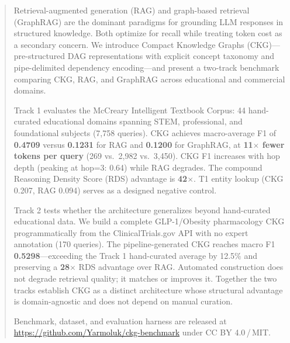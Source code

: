 \begin{abstract}
Retrieval-augmented generation (RAG) and graph-based retrieval (GraphRAG)
are the dominant paradigms for grounding LLM responses in structured
knowledge. Both optimize for recall while treating token cost as a
secondary concern. We introduce Compact Knowledge Graphs (CKG)---pre-structured
DAG representations with explicit concept taxonomy and pipe-delimited
dependency encoding---and present a two-track benchmark comparing CKG,
RAG, and GraphRAG across educational and commercial domains.

Track 1 evaluates the McCreary Intelligent Textbook Corpus: 44
hand-curated educational domains spanning STEM, professional, and
foundational subjects (7,758 queries). CKG achieves macro-average
F1 of \textbf{0.4709} versus \textbf{0.1231} for RAG and \textbf{0.1200}
for GraphRAG, at \textbf{11$\times$ fewer tokens per query} (269 vs.\
2,982 vs.\ 3,450). CKG F1 increases with hop depth (peaking at hop=3:
0.64) while RAG degrades. The compound Reasoning Density Score (RDS)
advantage is \textbf{42$\times$}. T1 entity lookup (CKG 0.207, RAG 0.094)
serves as a designed negative control.

Track 2 tests whether the architecture generalizes beyond hand-curated
educational data. We build a complete GLP-1/Obesity pharmacology CKG
programmatically from the ClinicalTrials.gov API with no expert
annotation (170 queries). The pipeline-generated CKG reaches macro F1
\textbf{0.5298}---exceeding the Track 1 hand-curated average by 12.5\%
and preserving a \textbf{28$\times$} RDS advantage over RAG. Automated
construction does not degrade retrieval quality; it matches or improves
it. Together the two tracks establish CKG as a distinct architecture
whose structural advantage is domain-agnostic and does not depend on
manual curation.

Benchmark, dataset, and evaluation harness are released at
\url{https://github.com/Yarmoluk/ckg-benchmark}
under CC BY 4.0\,/\,MIT.
\end{abstract}
